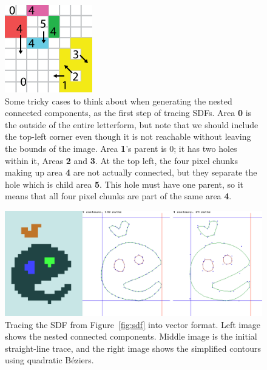 \documentclass[twocolumn]{article}
\begin{document}
\begin{figure}[ht]
  \centering
\includegraphics[width=0.6 \linewidth]{connected}
\caption{
  Some tricky cases to think about when generating the nested
  connected components, as the first step of tracing SDFs. Area
  {\bf 0} is the outside of the entire letterform, but note that
  we should include the top-left corner even though it is not
  reachable without leaving the bounds of the image. Area {\bf 1}'s
  parent is 0; it has two holes within it, Areas {\bf 2} and {\bf 3}.
  At the top left, the four pixel chunks making up area {\bf 4} are
  not actually connected, but they separate the hole which is
  child area {\bf 5}. This hole must have one parent, so it means
  that all four pixel chunks are part of the same area {\bf 4}.
} \label{fig:connected}
\end{figure}

\begin{figure}[ht]
  \centering
\includegraphics[width=0.95 \linewidth]{trace}
\caption{ Tracing the SDF from Figure~\ref{fig:sdf} into vector
  format. Left image shows the nested connected components. Middle
  image is the initial straight-line trace, and the right image
  shows the simplified contours using quadratic B\'eziers.
} \label{fig:trace}
\end{figure}
\end{document}

